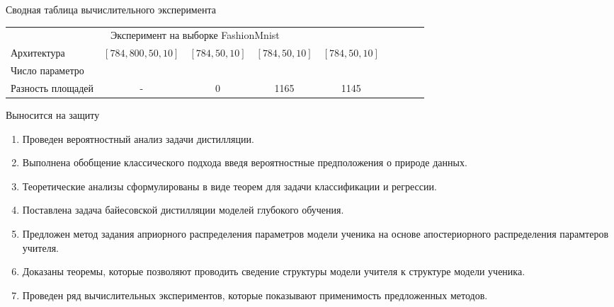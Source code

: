 \documentclass[10pt,pdf,hyperref={unicode}]{beamer}
\begin{document}
\begin{frame}{Сводная таблица вычислительного эксперимента}
\begin{table}[]
\begin{center}
{\begin{tabular}{|l|c|c|c|c|llll}
\multicolumn{5}{|c|}{Эксперимент на выборке FashionMnist}                                                     &                      &                      &                      &                      \\ \cline{1-5}
Архитектура           & $[784,800,50,10]$& $[784,50,10]$   & $[784,50,10]$  & $[784,50,10]$      &                      &                      &                      &                      \\ \cline{1-5}
Число параметро    &                             &                          &                         &                             &                      &                      &                      &                      \\ \cline{1-5}
Разность площадей   & -                           & 0                       &  1165               & 1145                    &                      &                      &                      &                      \\ \cline{1-5}
\end{tabular}
}
\end{center}
\end{table}


\end{frame}

\begin{frame}{Выносится на защиту}
\justifying
	\begin{enumerate}
	\justifying
		\item Проведен вероятностный анализ задачи дистилляции.
		\item Выполнена обобщение классического подхода введя вероятностные предположения о природе данных.
		\item Теоретические анализы сформулированы в виде теорем для задачи классификации и регрессии.
		\item Поставлена задача байесовской дистилляции моделей глубокого обучения.
		\item Предложен метод задания априорного распределения параметров модели ученика на основе апостериорного распределения парамтеров учителя.
		\item Доказаны теоремы, которые позволяют проводить сведение структуры модели учителя к структуре модели ученика.
		\item Проведен ряд вычислительных экспериментов, которые показывают применимость предложенных методов.
	\end{enumerate}

\end{frame}
\end{document}
